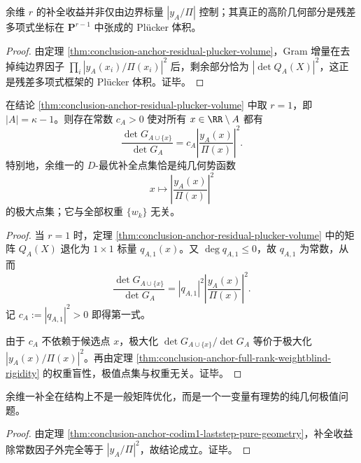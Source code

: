 \begin{corollary}\label{cor:conclusion-anchor-residual-plucker-geometry}
余维 \(r\) 的补全收益并非仅由边界标量 \(|y_A/\Pi|\) 控制；其真正的高阶几何部分是残差多项式坐标在 \(\mathbf P^{r-1}\) 中张成的 Pl\"ucker 体积。
\end{corollary}
\begin{proof}
由定理 \ref{thm:conclusion-anchor-residual-plucker-volume}，Gram 增量在去掉纯边界因子 \(\prod_i |y_A(x_i)/\Pi(x_i)|^2\) 后，剩余部分恰为 \(|\det Q_A(X)|^2\)，这正是残差多项式框架的 Pl\"ucker 体积。证毕。
\end{proof}

\begin{theorem}\label{thm:conclusion-anchor-codim1-laststep-pure-geometry}
在结论 \ref{thm:conclusion-anchor-residual-plucker-volume} 中取 \(r=1\)，即 \(|A|=\kappa-1\)。则存在常数 \(c_A>0\) 使对所有 \(x\in\RR\setminus A\) 都有
\[
\frac{\det G_{A\cup\{x\}}}{\det G_A}
=
c_A\left|\frac{y_A(x)}{\Pi(x)}\right|^2.
\]
特别地，余维一的 \(D\)-最优补全点集恰是纯几何势函数
\[
x\longmapsto \left|\frac{y_A(x)}{\Pi(x)}\right|^2
\]
的极大点集；它与全部权重 \(\{w_k\}\) 无关。
\end{theorem}
\begin{proof}
当 \(r=1\) 时，定理 \ref{thm:conclusion-anchor-residual-plucker-volume} 中的矩阵 \(Q_A(X)\) 退化为 \(1\times 1\) 标量 \(q_{A,1}(x)\)。又 \(\deg q_{A,1}\le 0\)，故 \(q_{A,1}\) 为常数，从而
\[
\frac{\det G_{A\cup\{x\}}}{\det G_A}
=
|q_{A,1}|^2\left|\frac{y_A(x)}{\Pi(x)}\right|^2.
\]
记 \(c_A:=|q_{A,1}|^2>0\) 即得第一式。

由于 \(c_A\) 不依赖于候选点 \(x\)，极大化 \(\det G_{A\cup\{x\}}/\det G_A\) 等价于极大化 \(|y_A(x)/\Pi(x)|^2\)。再由定理 \ref{thm:conclusion-anchor-full-rank-weightblind-rigidity} 的权重盲性，极值点集与权重无关。证毕。
\end{proof}

\begin{corollary}[最后一步补全的势函数塌缩]\label{cor:conclusion-anchor-laststep-scalar-potential-collapse}
余维一补全在结构上不是一般矩阵优化，而是一个一变量有理势的纯几何极值问题。
\end{corollary}
\begin{proof}
由定理 \ref{thm:conclusion-anchor-codim1-laststep-pure-geometry}，补全收益除常数因子外完全等于 \(|y_A/\Pi|^2\)，故结论成立。证毕。
\end{proof}

